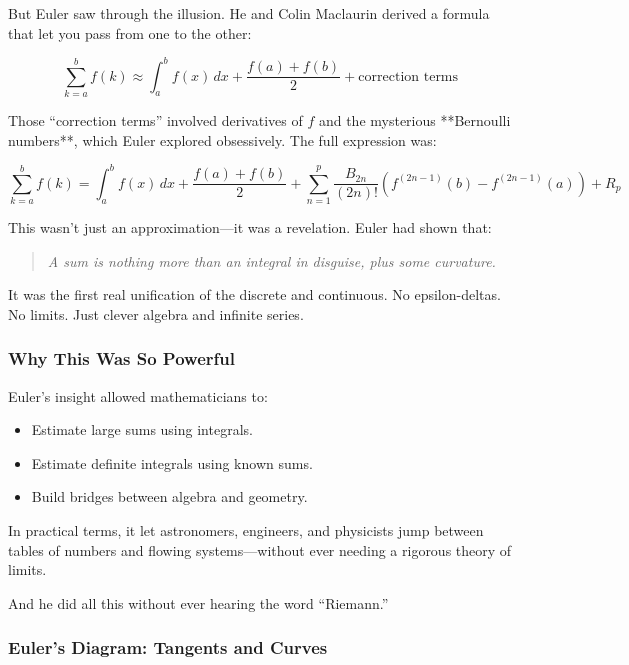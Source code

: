 But Euler saw through the illusion. He and Colin Maclaurin derived a formula that let you pass from one to the other:

\[
\sum_{k=a}^{b} f(k) \approx \int_a^b f(x) \, dx + \frac{f(a) + f(b)}{2} + \text{correction terms}
\]

Those “correction terms” involved derivatives of \( f \) and the mysterious **Bernoulli numbers**, which Euler explored obsessively. The full expression was:

\[
\sum_{k=a}^{b} f(k) = \int_a^b f(x)\,dx + \frac{f(a) + f(b)}{2} + \sum_{n=1}^{p} \frac{B_{2n}}{(2n)!} \left(f^{(2n-1)}(b) - f^{(2n-1)}(a)\right) + R_p
\]

This wasn’t just an approximation—it was a revelation. Euler had shown that:

\begin{quote}
\textit{A sum is nothing more than an integral in disguise, plus some curvature.}
\end{quote}

It was the first real unification of the discrete and continuous. No epsilon-deltas. No limits. Just clever algebra and infinite series.

\subsubsection{Why This Was So Powerful}

Euler’s insight allowed mathematicians to:

\begin{itemize}
  \item Estimate large sums using integrals.
  \item Estimate definite integrals using known sums.
  \item Build bridges between algebra and geometry.
\end{itemize}

In practical terms, it let astronomers, engineers, and physicists jump between tables of numbers and flowing systems—without ever needing a rigorous theory of limits.

And he did all this without ever hearing the word “Riemann.”

\vspace{1em}
\subsubsection{Euler’s Diagram: Tangents and Curves}

